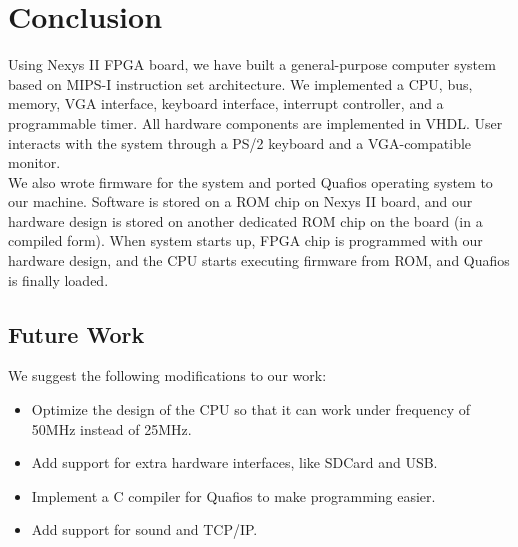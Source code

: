 \documentclass[oneside]{book}
\begin{document}

\chapter{Conclusion}

Using Nexys II FPGA board, we have built a general-purpose computer system
based on MIPS-I instruction set architecture. We implemented a CPU, bus, memory,
VGA interface, keyboard interface, interrupt controller, and a programmable
timer. All hardware components are implemented in VHDL. User interacts
with the system through a PS/2 keyboard and a VGA-compatible monitor. \\

We also wrote firmware for the system and ported Quafios operating system
to our machine. Software is stored on a ROM chip on Nexys II board,
and our hardware design is stored on another dedicated ROM chip on
the board (in a compiled form). When system starts up, FPGA chip
is programmed with our hardware design, and the CPU starts executing
firmware from ROM, and Quafios is finally loaded.

\section{Future Work}

We suggest the following modifications to our work:

\begin{itemize}

\item Optimize the design of the CPU so that it can work under frequency
      of 50MHz instead of 25MHz.

\item Add support for extra hardware interfaces, like SDCard and USB.

\item Implement a C compiler for Quafios to make programming easier.

\item Add support for sound and TCP/IP.

\end{itemize}



\end{document}
